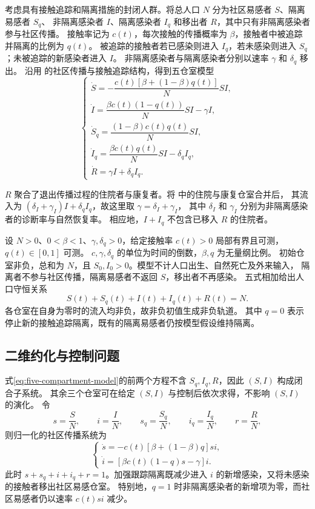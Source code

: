 \documentclass[11pt,a4paper,UTF8]{ctexart}
\theoremstyle{definition}
\begin{document}
考虑具有接触追踪和隔离措施的封闭人群。将总人口 $N$ 分为社区易感者 $S$、隔离易感者 $S_q$、
非隔离感染者 $I$、隔离感染者 $I_q$ 和移出者 $R$，其中只有非隔离感染者参与社区传播。
接触率记为 $c(t)$，每次接触的传播概率为 $\beta$，接触者中被追踪并隔离的比例为 $q(t)$。
被追踪的接触者若已感染则进入 $I_q$，若未感染则进入 $S_q$；未被追踪的新感染者进入 $I$。
非隔离感染者与隔离感染者分别以速率 $\gamma$ 和 $\delta_q$ 移出。
沿用 \citet{Zhou2024SPCI} 的社区传播与接触追踪结构，得到五仓室模型
\begin{equation}
\begin{cases}
\dot S=-\dfrac{c(t)[\beta+(1-\beta)q(t)]}{N}SI,\\[.4em]
\dot I=\dfrac{\beta c(t)(1-q(t))}{N}SI-\gamma I,\\[.4em]
\dot S_q=\dfrac{(1-\beta)c(t)q(t)}{N}SI,\\[.4em]
\dot I_q=\dfrac{\beta c(t)q(t)}{N}SI-\delta_q I_q,\\[.4em]
\dot R=\gamma I+\delta_q I_q.
\end{cases}
\label{eq:five-compartment-model}
\end{equation}

$R$ 聚合了退出传播过程的住院者与康复者。将 \citet[式(2.1)]{Zhou2024SPCI} 中的住院与康复仓室合并后，
其流入为 $(\delta_I+\gamma_I)I+\delta_q I_q$，故这里取 $\gamma=\delta_I+\gamma_I$，
其中 $\delta_I$ 和 $\gamma_I$ 分别为非隔离感染者的诊断率与自然恢复率。
相应地，$I+I_q$ 不包含已移入 $R$ 的住院者。

设 $N>0$、$0<\beta<1$、$\gamma,\delta_q>0$，给定接触率 $c(t)>0$ 局部有界且可测，$q(t)\in[0,1]$ 可测。
$c,\gamma,\delta_q$ 的单位为时间的倒数，$\beta,q$ 为无量纲比例。
初始仓室非负，总和为 $N$，且 $S_0,I_0>0$。模型不计人口出生、自然死亡及外来输入，
隔离者不参与社区传播，隔离易感者不返回 $S$，移出者不再感染。
五式相加给出人口守恒关系
\begin{equation}
 S(t)+S_q(t)+I(t)+I_q(t)+R(t)=N.
 \label{eq:five-compartment-conservation}
\end{equation}
各仓室在自身为零时的流入均非负，故非负初值生成非负轨道。
其中 $q=0$ 表示停止新的接触追踪隔离，既有的隔离易感者仍按模型假设维持隔离。

\subsection{二维约化与控制问题}

式\eqref{eq:five-compartment-model}的前两个方程不含 $S_q,I_q,R$，因此 $(S,I)$ 构成闭合子系统。
其余三个仓室可在给定 $(S,I)$ 与控制后依次求得，不影响 $(S,I)$ 的演化。
令
\[
 s=\frac SN,\qquad i=\frac IN,\qquad
 s_q=\frac{S_q}{N},\qquad i_q=\frac{I_q}{N},\qquad r=\frac RN,
\]
则归一化的社区传播系统为
\begin{equation}
\begin{cases}
\dot s=-c(t)[\beta+(1-\beta)q]si,\\
\dot i=[\beta c(t)(1-q)s-\gamma]i.
\end{cases}
\label{eq:normalized-model}
\end{equation}
此时 $s+s_q+i+i_q+r=1$。加强跟踪隔离既减少进入 $i$ 的新增感染，又将未感染的接触者移出社区易感仓室。
特别地，$q=1$ 时非隔离感染者的新增项为零，而社区易感者仍以速率 $c(t)si$ 减少。
\end{document}
